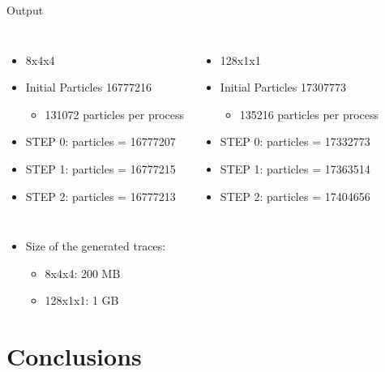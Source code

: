 \documentclass[aspectratio=169]{bredelebeamer}
\begin{document}
\begin{frame}{Output}

\begin{columns}


\begin{itemize}
\item 8x4x4
\item[] Initial Particles 16777216 
\begin{itemize}
	\item 131072 particles per process
\end{itemize}
\item[] STEP 0: particles = 16777207
\item[] STEP 1: particles = 16777215
\item[] STEP 2: particles = 16777213
\end{itemize}


\begin{itemize}
\item 128x1x1
\item[] Initial Particles 17307773 

\begin{itemize}
	\item 135216 particles per process
\end{itemize}
\item[] STEP 0: particles = 17332773
\item[] STEP 1: particles = 17363514
\item[] STEP 2: particles = 17404656
\end{itemize}


\end{columns}

\vspace{1cm}

\begin{itemize}
\item Size of the generated traces:
\begin{itemize}
	\item 8x4x4: 200 MB
	\item 128x1x1: 1 GB
\end{itemize}
\end{itemize}


\end{frame}


\section{Conclusions}
\end{document}
